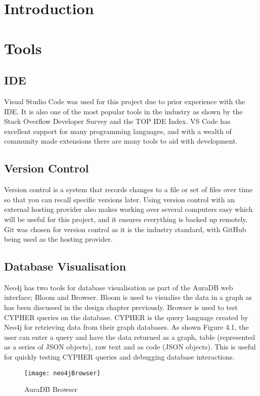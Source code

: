 \section{Introduction}
\section{Tools}
\subsection{IDE}
Visual Studio Code was used for this project due to prior experience with the IDE. It is also one of the most popular tools in the industry 
as shown by the Stack Overflow Developer Survey\cite{StackOverflowDeveloper} and the TOP IDE Index\cite{TOPIDETop}.
VS Code has excellent support for many programming languages, and with a wealth of community made extensions there are many tools to aid with development.
\subsection{Version Control}
Version control is a system that records changes to a file or set of files over time so that you can recall specific versions later.\cite{GitVersionControl}
Using version control with an external hosting provider also makes working over several computers easy which will be useful for this project, and it ensures everything is backed up remotely.
Git was chosen for version control as it is the industry standard, with GitHub being used as the hosting provider.
\subsection{Database Visualisation}
Neo4j has two tools for database visualisation as part of the AuraDB web interface; Bloom and Browser. Bloom is used to 
visualise the data in a graph as has been discussed in the design chapter previously. Browser is used to test CYPHER queries on the database.
CYPHER is the query language created by Neo4j for retrieving data from their graph databases. As shown Figure 4.1, the user can enter a 
query and have the data returned as a graph, table (represented as a series of JSON objects), raw text and as code (JSON objects).
This is useful for quickly testing CYPHER queries and debugging database interactions.
\begin{figure}[h]
    \centering
    \texttt{[image: neo4jBrowser]}
    \caption{AuraDB Browser}
\end{figure}
